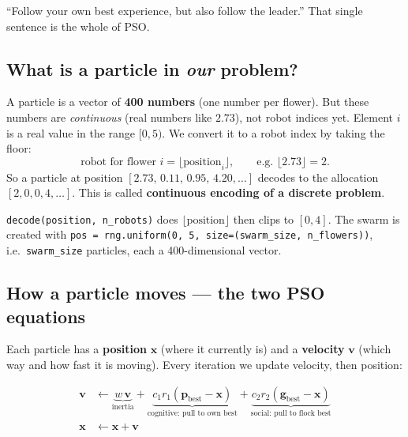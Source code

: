 \documentclass[11pt]{article}
\begin{document}
\begin{intuition}
``Follow your own best experience, but also follow the leader.'' That single
sentence is the whole of PSO.
\end{intuition}

\subsection{What is a particle in \emph{our} problem?}

\begin{tcolorbox}[colback=blue!5!white,colframe=blue!50!black,title=One particle represents all 400 flowers]
A particle is a vector of \textbf{400 numbers} (one number per flower). But these
numbers are \emph{continuous} (real numbers like $2.73$), not robot indices yet.
Element $i$ is a real value in the range $[0,5)$. We convert it to a robot index
by taking the floor:
\[
\text{robot for flower } i = \big\lfloor \text{position}_i \big\rfloor,
\qquad\text{e.g. } \lfloor 2.73 \rfloor = 2.
\]
So a particle at position $[2.73,\,0.11,\,0.95,\,4.20,\dots]$ decodes to the
allocation $[2,0,0,4,\dots]$. This is called \textbf{continuous encoding of a
discrete problem}.
\end{tcolorbox}

\begin{codebox}
\texttt{decode(position, n\_robots)} does
$\lfloor \text{position} \rfloor$ then clips to $[0,4]$. The swarm is created
with \texttt{pos = rng.uniform(0, 5, size=(swarm\_size, n\_flowers))}, i.e.\
\texttt{swarm\_size} particles, each a 400-dimensional vector.
\end{codebox}

\subsection{How a particle moves --- the two PSO equations}

Each particle has a \textbf{position} $\mathbf{x}$ (where it currently is) and a
\textbf{velocity} $\mathbf{v}$ (which way and how fast it is moving). Every
iteration we update velocity, then position:

\begin{align}
\mathbf{v} &\leftarrow \underbrace{w\,\mathbf{v}}_{\text{inertia}}
 + \underbrace{c_1 r_1 (\mathbf{p}_{\text{best}} - \mathbf{x})}_{\text{cognitive: pull to own best}}
 + \underbrace{c_2 r_2 (\mathbf{g}_{\text{best}} - \mathbf{x})}_{\text{social: pull to flock best}}
 \label{eq:vel}\\[4pt]
\mathbf{x} &\leftarrow \mathbf{x} + \mathbf{v}
 \label{eq:pos}
\end{align}
\end{document}
